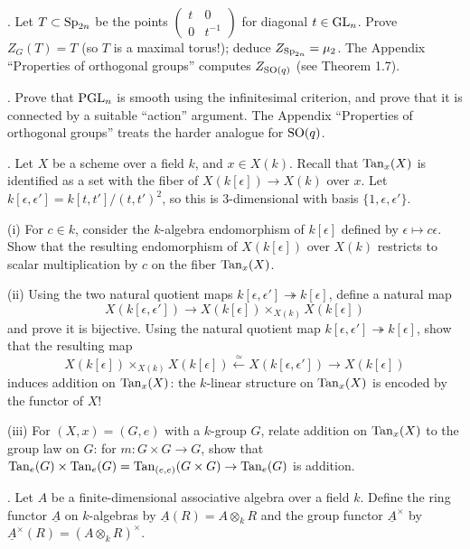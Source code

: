 \documentclass[10pt]{amsart}
\begin{document}
\medskip{}.  Let $T \subset {\rm{Sp}}_{2n}$ be the
points $\left(\begin{smallmatrix} t & 0 \\ 0 & t^{-1} \end{smallmatrix}\right)$
for diagonal $t \in {\rm{GL}}_n$.  Prove $Z_G(T) = T$ (so $T$ is a maximal torus!);
deduce $Z_{{\rm{Sp}}_{2n}} = \mu_2$.
The Appendix ``Properties of orthogonal groups'' computes $Z_{{\rm{SO}}(q)}$ (see Theorem 1.7). 


\medskip{}.  Prove that ${\rm{PGL}}_n$ is smooth using the infinitesimal criterion, and prove that it
is connected by a suitable ``action'' argument.
The Appendix ``Properties of orthogonal groups'' treats the harder analogue for ${\rm{SO}}(q)$.



\medskip{}.  Let $X$ be a scheme over a field $k$, and $x \in X(k)$.
Recall that ${\rm{Tan}}_x(X)$ is identified as a set with the fiber of
$X(k[\epsilon]) \rightarrow X(k)$ over $x$. 
Let $k[\epsilon,\epsilon'] = k[t,t']/(t,t')^2$, so this is 3-dimensional with basis $\{1, \epsilon, \epsilon'\}$.

(i)  For $c \in k$, consider the $k$-algebra endomorphism of $k[\epsilon]$
defined by $\epsilon \mapsto c \epsilon$.  Show that the resulting endomorphism of
$X(k[\epsilon])$ over $X(k)$ restricts to scalar multiplication by $c$ on the fiber
${\rm{Tan}}_x(X)$. 

(ii) Using the two natural quotient maps $k[\epsilon, \epsilon'] \twoheadrightarrow k[\epsilon]$, 
define a natural map 
$$X(k[\epsilon, \epsilon']) \rightarrow
X(k[\epsilon]) \times_{X(k)} X(k[\epsilon])$$
and prove it is bijective.  Using the natural quotient map $k[\epsilon, \epsilon'] \twoheadrightarrow
k[\epsilon]$, show that the resulting map
$$X(k[\epsilon]) \times_{X(k)} X(k[\epsilon]) \stackrel{\simeq}{\leftarrow} 
X(k[\epsilon, \epsilon']) \rightarrow X(k[\epsilon])$$
induces addition on ${\rm{Tan}}_x(X)$: 
the $k$-linear structure on ${\rm{Tan}}_x(X)$ is encoded by the functor of $X$!

(iii) For $(X,x) = (G,e)$ with a $k$-group $G$, relate addition on ${\rm{Tan}}_x(X)$ to the group 
law on $G$:  for $m:G \times G \rightarrow G$, show that
${\rm{Tan}}_e(G) \times {\rm{Tan}}_e(G) =
{\rm{Tan}}_{(e,e)}(G \times G) \rightarrow {\rm{Tan}}_e(G)$ 
is addition. 

\medskip{}.  Let $A$ be a finite-dimensional associative algebra over a field $k$.
Define the ring functor 
$\underline{A}$ on $k$-algebras by 
$\underline{A}(R) = A \otimes_k R$ and the group functor
$\underline{A}^{\times}$ by $\underline{A}^{\times}(R) = (A \otimes_k R)^{\times}$.  
\end{document}
